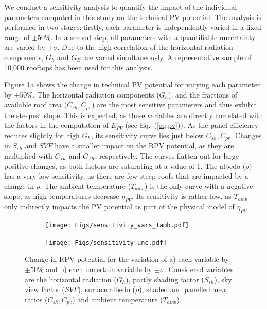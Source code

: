 We conduct a sensitivity analysis to quantify the impact of the individual parameters computed in this study on the technical PV potential. The analysis is performed in two stages: firstly, each parameter is independently varied in a fixed range of $\pm 50\%$. 
In a second step, all parameters with a quantifiable uncertainty are varied by $\pm \sigma$. 
Due to the high correlation of the horizontal radiation components, $G_h$ and $G_B$ are varied simultaneously. A representative sample of 10,000 rooftops has been used for this analysis.

Figure \ref{fig:sens_vars}a shows the change in technical PV potential for varying each parameter by $\pm 50\%$. The horizontal radiation components ($G_h$), and the fractions of available roof area ($C_{sh}, C_{pv}$) are the most sensitive parameters and thus exhibit the steepest slope. 
This is expected, as these variables are directly correlated with the factors in the computation of $E_{PV}$ (see Eq.~(\ref{eq:pv})). 
As the panel efficiency reduces slightly for high $G_h$, its sensitivity curve lies just below $C_{sh}, C_{pv}$.
Changes in $S_{sh}$ and $SVF$ have a smaller impact on the RPV potential, as they are multiplied with $G_{Bt}$ and $G_{Dt}$, respectively. 
The curves flatten out for large positive changes, as both factors are saturating at a value of 1. 
The albedo ($\rho$) has a very low sensitivity, as there are few steep roofs that are impacted by a change in $\rho$.
The ambient temperature ($T_{amb}$) is the only curve with a negative slope, as high temperatures decrease $\eta_{PV}$. Its sensitivity is rather low, as $T_{amb}$ only indirectly impacts the PV potential as part of the physical model of $\eta_{PV}$. 

\begin{figure}[tb]
\centering
\begin{subfigure}{.49\textwidth}
  \centering
  \texttt{[image: Figs/sensitivity\_vars\_Tamb.pdf]}
  \subcaption{}
\end{subfigure}
\begin{subfigure}{.49\textwidth}
  \centering
  \texttt{[image: Figs/sensitivity\_unc.pdf]}  
  \subcaption{}
\end{subfigure}
\caption{Change in RPV potential for the variation of a) each variable by $\pm 50\%$ and b) each uncertain variable by $\pm \sigma$. Considered variables are the horizontal radiation ($G_h$), partly shading factor ($S_{sh}$), sky view factor ($SVF$), surface albedo ($\rho$), shaded and panelled area ratios ($C_{sh}, C_{pv}$) and ambient temperature ($T_{amb}$).}
\label{fig:sens_vars}
\end{figure}

